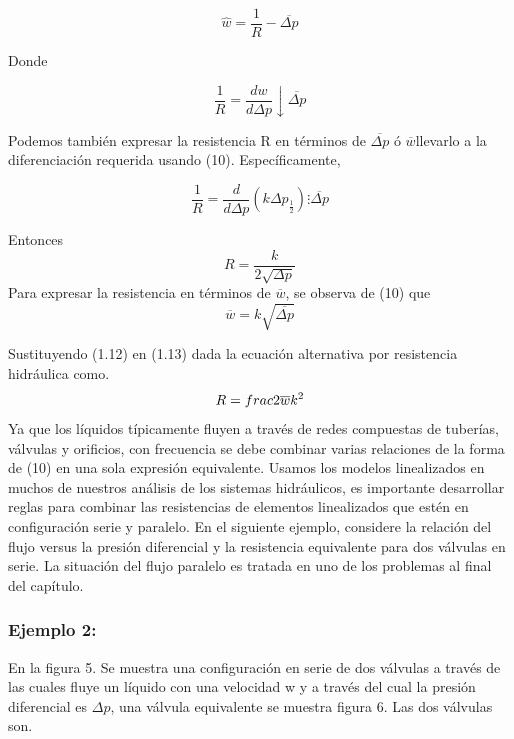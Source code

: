 \documentclass[a4paper,12pt,twoside]{proyectotanquesecci}
\begin{document}
\begin{equation}
\widehat{w}=\frac{1}{R}-\overline{\Delta p}
\end{equation}

Donde

\begin{equation}
\frac{1}{R}=\frac{dw}{d\Delta p}\downarrow\overline{\Delta p}
\end{equation}

Podemos también expresar la resistencia R en términos de $\overline{\Delta p}$ ó $\overline{w}$llevarlo a la diferenciación requerida usando (10). Específicamente,

\begin{equation}
\frac{1}{R}=\frac{d}{d\Delta p}(k\Delta p_{\frac{1}{2}})\vdots \overline{\Delta p}
\end{equation}

Entonces
\begin{equation}
R=\frac{k}{2\sqrt{\Delta p}}
\end{equation} 
Para expresar la resistencia en términos de $\overline{w}$, se observa de (10) que 
\begin{equation}
\overline{w}=k\sqrt{\overline{\Delta p}}
\end{equation}

Sustituyendo (1.12) en (1.13) dada la ecuación alternativa por resistencia hidráulica como.
\begin{equation}
R=\\frac{2\overline{w}}{k^{2}}
\end{equation}
Ya que los líquidos típicamente fluyen a través de redes compuestas de tuberías, válvulas y orificios, con frecuencia se debe combinar varias relaciones de la forma de (10) en una sola expresión equivalente. Usamos los modelos linealizados en muchos de nuestros análisis de los sistemas hidráulicos, es importante desarrollar reglas para combinar las resistencias de elementos linealizados que estén en configuración serie y paralelo. En el siguiente ejemplo, considere la relación del flujo versus la presión diferencial y la resistencia equivalente para dos válvulas en serie. La situación del flujo paralelo es tratada en uno de los problemas al final del capítulo.

\subsubsection{Ejemplo 2:}

En la figura 5. Se muestra una configuración en serie de dos válvulas a través  de las cuales fluye un líquido con una velocidad w y a través del cual la presión diferencial es ${\Delta p}$, una válvula equivalente se muestra figura 6. Las dos válvulas son.
\end{document}
